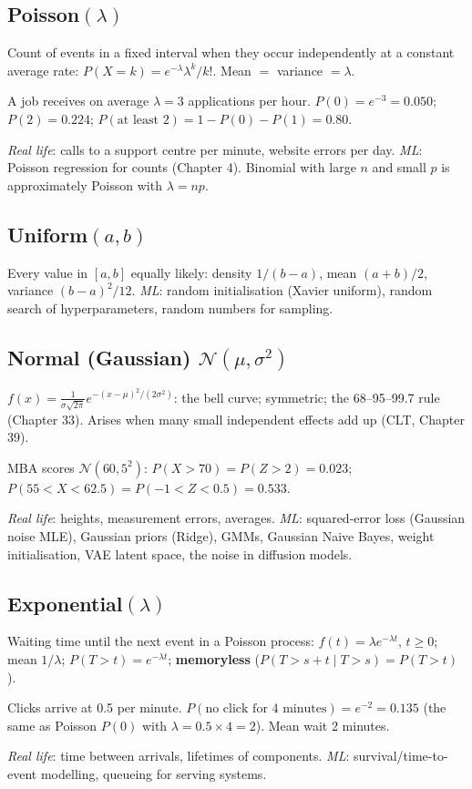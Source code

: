 \subsection{Poisson$(\lambda)$}
Count of events in a fixed interval when they occur independently at a constant average rate: $P(X = k) = e^{-\lambda}\lambda^k/k!$. Mean $=$ variance $= \lambda$.
\begin{example}[: Poisson]
A job receives on average $\lambda = 3$ applications per hour. $P(0) = e^{-3} = 0.050$; $P(2) = 0.224$; $P(\text{at least 2}) = 1 - P(0) - P(1) = 0.80$.
\end{example}
\emph{Real life}: calls to a support centre per minute, website errors per day. \emph{ML}: Poisson regression for counts (Chapter 4). Binomial with large $n$ and small $p$ is
approximately Poisson with $\lambda = np$.

\subsection{Uniform$(a, b)$}
Every value in $[a, b]$ equally likely: density $1/(b-a)$, mean $(a+b)/2$, variance $(b-a)^2/12$. \emph{ML}: random initialisation (Xavier uniform), random search of
hyperparameters, random numbers for sampling.

\subsection{Normal (Gaussian) $\mathcal N(\mu,\sigma^2)$}
$f(x) = \frac{1}{\sigma\sqrt{2\pi}}e^{-(x-\mu)^2/(2\sigma^2)}$: the bell curve; symmetric; the 68--95--99.7 rule (Chapter 33). Arises when many small independent effects add up
(CLT, Chapter 39).
\begin{example}[: normal]
MBA scores $\mathcal N(60, 5^2)$: $P(X > 70) = P(Z > 2) = 0.023$; $P(55 < X < 62.5) = P(-1 < Z < 0.5) = 0.533$.
\end{example}
\emph{Real life}: heights, measurement errors, averages. \emph{ML}: squared-error loss (Gaussian noise MLE), Gaussian priors (Ridge), GMMs, Gaussian Naive Bayes, weight
initialisation, VAE latent space, the noise in diffusion models.

\subsection{Exponential$(\lambda)$}
Waiting time until the next event in a Poisson process: $f(t) = \lambda e^{-\lambda t}$, $t\ge0$; mean $1/\lambda$; $P(T > t) = e^{-\lambda t}$; \textbf{memoryless}
($P(T > s + t\mid T > s) = P(T > t)$).
\begin{example}[: exponential]
Clicks arrive at 0.5 per minute. $P(\text{no click for 4 minutes}) = e^{-2} = 0.135$ (the same as Poisson $P(0)$ with $\lambda = 0.5\times4 = 2$). Mean wait 2 minutes.
\end{example}
\emph{Real life}: time between arrivals, lifetimes of components. \emph{ML}: survival/time-to-event modelling, queueing for serving systems.

